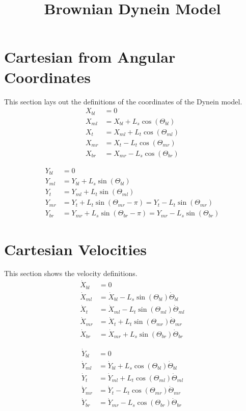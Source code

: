 \documentclass[11pt, landscape]{article}
\title{Brownian Dynein Model}
\begin{document}
\maketitle

\section{Cartesian from Angular Coordinates}
This section lays out the definitions of the coordinates of the Dynein model. \\
\begin{align}
  X_{bl} &= 0 \\
  X_{ml} &= X_{bl}+L_{s}\cos(\Theta_{bl}) \\
  X_{t}  &= X_{ml}+L_{t}\cos(\Theta_{ml}) \\
  X_{mr} &= X_{t} - L_{t}\cos(\Theta_{mr}) \\
  X_{br} &= X_{mr} - L_{s}\cos(\Theta_{br})
\end{align}

\begin{align}
  Y_{bl} &= 0 \\
  Y_{ml} &= Y_{bl}+L_{s}\sin(\Theta_{bl}) \\
  Y_{t}  &= Y_{ml}+L_{t}\sin(\Theta_{ml}) \\
  Y_{mr} &= Y_{t} +L_{t}\sin(\Theta_{mr}-\pi) = Y_{t} - L_{t}\sin(\Theta_{mr}) \\
  Y_{br} &= Y_{mr}+L_{s}\sin(\Theta_{br}-\pi) = Y_{mr} - L_{s}\sin(\Theta_{br})
\end{align}

\section{Cartesian Velocities}
This section shows the velocity definitions. \\
\begin{align}
  \dot{X}_{bl} &= 0 \\
  \dot{X}_{ml} &= \dot{X}_{bl} - L_{s}\sin(\Theta_{bl})\dot{\Theta}_{bl} \\
  \dot{X}_{t } &= \dot{X}_{ml} - L_{t}\sin(\Theta_{ml})\dot{\Theta}_{ml} \\
  \dot{X}_{mr} &= \dot{X}_{t } + L_{t}\sin(\Theta_{mr})\dot{\Theta}_{mr} \\
  \dot{X}_{br} &= \dot{X}_{mr} + L_{s}\sin(\Theta_{br})\dot{\Theta}_{br}
\end{align}  
             
\begin{align}                                                                          
  \dot{Y}_{bl} &= 0 \\                                                        
  \dot{Y}_{ml} &= \dot{Y}_{bl} + L_{s}\cos(\Theta_{bl})\dot{\Theta}_{bl} \\
  \dot{Y}_{t}  &= \dot{Y}_{ml} + L_{t}\cos(\Theta_{ml})\dot{\Theta}_{ml} \\
  \dot{Y}_{mr} &= \dot{Y}_{t } - L_{t}\cos(\Theta_{mr})\dot{\Theta}_{mr} \\
  \dot{Y}_{br} &= \dot{Y}_{mr} - L_{s}\cos(\Theta_{br})\dot{\Theta}_{br}
\end{align}
\end{document}

